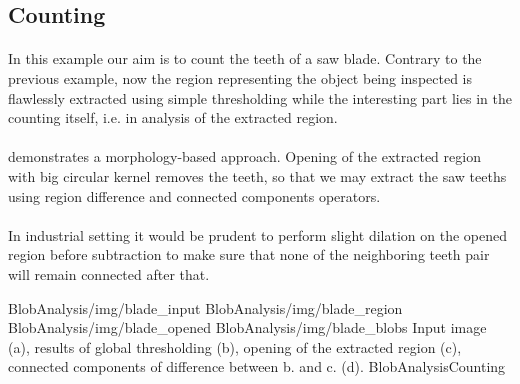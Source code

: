 \subsection{Counting}

\paragraph*{}
In this example our aim is to count the teeth of a saw blade. Contrary to the previous example, now the region representing the object being inspected is flawlessly extracted using simple thresholding while the interesting part lies in the counting itself, i.e. in analysis of the extracted region.

\paragraph*{}
 demonstrates a morphology-based approach. Opening of the extracted region with big circular kernel removes the teeth, so that we may extract the saw teeths using region difference and connected components operators.

\paragraph*{}
In industrial setting it would be prudent to perform slight dilation on the opened region before subtraction to make sure that none of the neighboring teeth pair will remain connected after that.

\fourFigures
{BlobAnalysis/img/blade_input}
{BlobAnalysis/img/blade_region}
{BlobAnalysis/img/blade_opened}
{BlobAnalysis/img/blade_blobs}
{Input image (a), results of global thresholding (b), opening of the extracted region (c), connected components of difference between b. and c. (d).}
{BlobAnalysisCounting}
{\basicWidth}